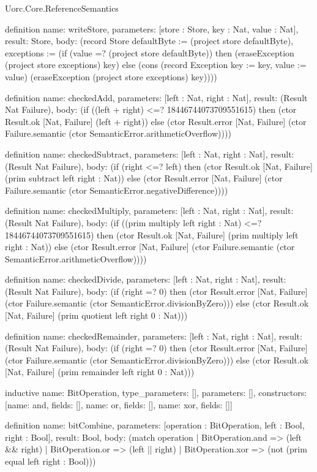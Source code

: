 \begin{lexlean}{Uorc.Core.ReferenceSemantics}
\begin{semanticmodule}
definition{
  name: writeStore,
  parameters: [store : Store, key : Nat, value : Nat],
  result: Store,
  body: (record Store {defaultByte := (project store defaultByte), exceptions := (if (value =? (project store defaultByte)) then (eraseException (project store exceptions) key) else (cons (record Exception {key := key, value := value}) (eraseException (project store exceptions) key)))})
}

definition{
  name: checkedAdd,
  parameters: [left : Nat, right : Nat],
  result: (Result Nat Failure),
  body: (if ((left + right) <=? 18446744073709551615) then (ctor Result.ok [Nat, Failure] (left + right)) else (ctor Result.error [Nat, Failure] (ctor Failure.semantic (ctor SemanticError.arithmeticOverflow))))
}

definition{
  name: checkedSubtract,
  parameters: [left : Nat, right : Nat],
  result: (Result Nat Failure),
  body: (if (right <=? left) then (ctor Result.ok [Nat, Failure] (prim subtract left right : Nat)) else (ctor Result.error [Nat, Failure] (ctor Failure.semantic (ctor SemanticError.negativeDifference))))
}

definition{
  name: checkedMultiply,
  parameters: [left : Nat, right : Nat],
  result: (Result Nat Failure),
  body: (if ((prim multiply left right : Nat) <=? 18446744073709551615) then (ctor Result.ok [Nat, Failure] (prim multiply left right : Nat)) else (ctor Result.error [Nat, Failure] (ctor Failure.semantic (ctor SemanticError.arithmeticOverflow))))
}

definition{
  name: checkedDivide,
  parameters: [left : Nat, right : Nat],
  result: (Result Nat Failure),
  body: (if (right =? 0) then (ctor Result.error [Nat, Failure] (ctor Failure.semantic (ctor SemanticError.divisionByZero))) else (ctor Result.ok [Nat, Failure] (prim quotient left right 0 : Nat)))
}

definition{
  name: checkedRemainder,
  parameters: [left : Nat, right : Nat],
  result: (Result Nat Failure),
  body: (if (right =? 0) then (ctor Result.error [Nat, Failure] (ctor Failure.semantic (ctor SemanticError.divisionByZero))) else (ctor Result.ok [Nat, Failure] (prim remainder left right 0 : Nat)))
}

inductive{
  name: BitOperation,
  type_parameters: [],
  parameters: [],
  constructors: [{name: and, fields: []}, {name: or, fields: []}, {name: xor, fields: []}]
}

definition{
  name: bitCombine,
  parameters: [operation : BitOperation, left : Bool, right : Bool],
  result: Bool,
  body: (match operation
    | BitOperation.and => (left && right)
    | BitOperation.or => (left || right)
    | BitOperation.xor => (not (prim equal left right : Bool)))
}


\end{semanticmodule}
\end{lexlean}
